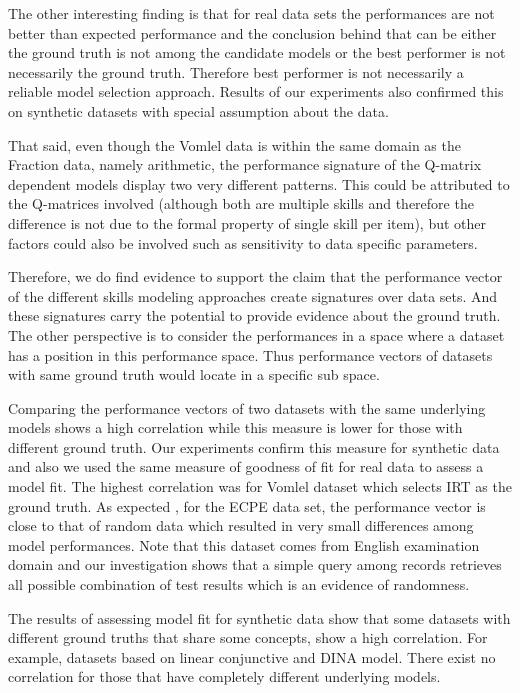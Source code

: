 The other interesting finding is that for real data sets the performances are not better than expected performance and the conclusion behind that can be either the ground truth is not among the candidate models or the best performer is not necessarily the ground truth. Therefore best performer is not necessarily a reliable model selection approach. Results of our experiments also confirmed this on synthetic datasets with special assumption about the data. 

That said, even though the Vomlel data is within the same domain as the Fraction data, namely arithmetic, the performance signature of the Q-matrix dependent models display two very different patterns.  This could be attributed to the Q-matrices involved (although both are multiple skills and therefore the difference is not due to the formal property of single skill per item), but other factors could also be involved such as sensitivity to data specific parameters.

Therefore, we do find evidence to support the claim that the performance vector of the different skills modeling approaches create signatures over data sets.  And these signatures carry the potential to provide evidence about the ground truth. The other perspective is to consider the performances in a space where a dataset has a position in this performance space. Thus performance vectors of datasets with same ground truth would locate in a specific sub space.

Comparing the performance vectors of two datasets with the same underlying models shows a high correlation while this measure is lower for those with different ground truth. Our experiments confirm this measure for synthetic data and also we used the same measure of goodness of fit for real data to assess a model fit. The highest correlation was for Vomlel dataset which selects IRT as the ground truth. As expected , for the ECPE data set, the performance vector is close to that of random data which resulted in very small differences among model performances. Note that this dataset comes from English examination domain and our investigation shows that a simple query among records retrieves all possible combination of test results which is an evidence of randomness.

The results of assessing model fit for synthetic data show that some datasets with different ground truths that share some concepts, show a high correlation. For example, datasets based on linear conjunctive and DINA model. There exist no correlation for those that have completely different underlying models.

